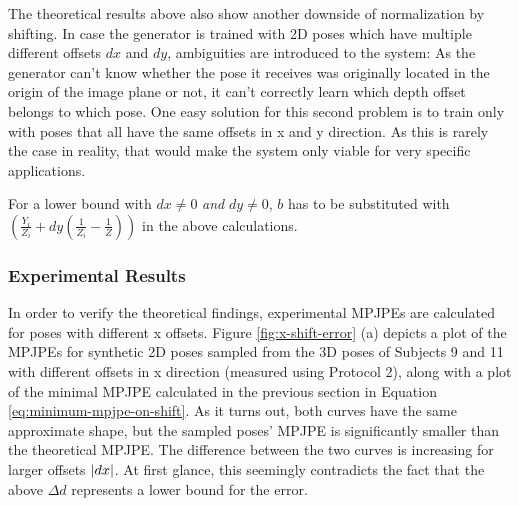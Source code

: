 The theoretical results above also show another downside of normalization by shifting.
In case the generator is trained with 2D poses which have multiple different offsets $dx$ and $dy$, ambiguities are introduced to the system:
As the generator can't know whether the pose it receives was originally located in the origin of the image plane or not, it can't correctly learn which depth offset belongs to which pose.
One easy solution for this second problem is to train only with poses that all have the same offsets in x and y direction.
As this is rarely the case in reality, that would make the system only viable for very specific applications.

For a lower bound with $dx \neq 0$ \emph{and} $dy \neq 0$, $b$ has to be substituted with $\left( \frac{Y_i}{Z_i} + dy \left( \frac{1}{Z_i} - \frac{1}{Z} \right) \right )$ in the above calculations.

\subsubsection{Experimental Results}

In order to verify the theoretical findings, experimental MPJPEs are calculated for poses with different x offsets.
Figure \ref{fig:x-shift-error} (a) depicts a plot of the MPJPEs for synthetic 2D poses sampled from the 3D poses of Subjects 9 and 11 with different offsets in x direction (measured using Protocol 2), along with a plot of the minimal MPJPE calculated in the previous section in Equation \eqref{eq:minimum-mpjpe-on-shift}.
As it turns out, both curves have the same approximate shape, but the sampled poses' MPJPE is significantly smaller than the theoretical MPJPE.
The difference between the two curves is increasing for larger offsets $\abs{dx}$.
At first glance, this seemingly contradicts the fact that the above $\Delta d$ represents a lower bound for the error.

